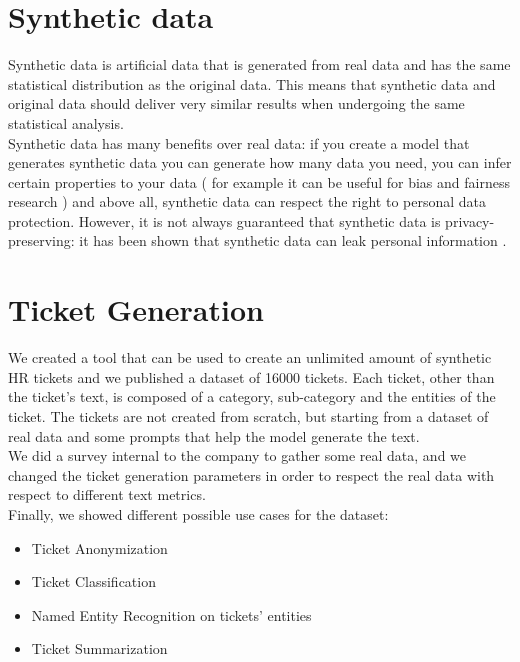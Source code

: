 \section{Synthetic data}
Synthetic data is artificial data that is generated from real data and has the same statistical distribution as the original data. This means that synthetic data and original data should deliver very similar results when undergoing the same statistical analysis. \\
Synthetic data has many benefits over real data: if you create a model that generates synthetic data you can generate how many data you need, you can infer certain properties to your data ( for example it can be useful for bias and fairness research ) and above all, synthetic data can respect the right to personal data protection. However, it is not always guaranteed that synthetic data is privacy-preserving: it has been shown that synthetic data can leak personal information \cite{bellovin2019privacy}.\\

\section{Ticket Generation}
We created a tool that can be used to create an unlimited amount of synthetic HR tickets and we published a dataset of 16000 tickets. Each ticket, other than the ticket's text, is composed of a category, sub-category and the entities of the ticket. The tickets are not created from scratch, but starting from a dataset of real data and some prompts that help the model generate the text. \\
We did a survey internal to the company to gather some real data, and we changed the ticket generation parameters in order to respect the real data with respect to different text metrics. \\
Finally, we showed different possible use cases for the dataset:
\begin{itemize}
    \item Ticket Anonymization
    \item Ticket Classification
    \item Named Entity Recognition on tickets' entities
    \item Ticket Summarization
\end{itemize}